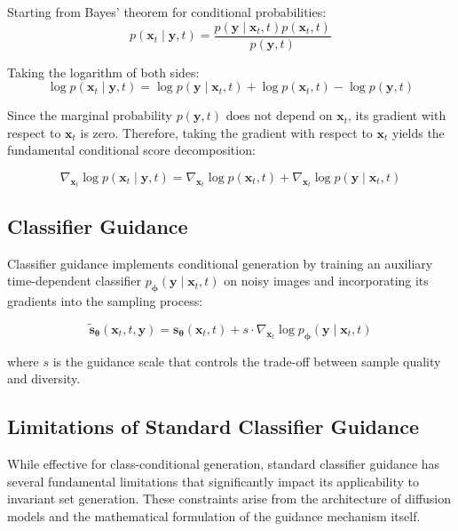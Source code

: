 Starting from Bayes' theorem for conditional probabilities:
$$p(\mathbf{x}_t \mid \mathbf{y}, t) = \frac{p(\mathbf{y} \mid \mathbf{x}_t, t) p(\mathbf{x}_t, t)}{p(\mathbf{y}, t)}$$

Taking the logarithm of both sides:
$$\log p(\mathbf{x}_t \mid \mathbf{y}, t) = \log p(\mathbf{y} \mid \mathbf{x}_t, t) + \log p(\mathbf{x}_t, t) - \log p(\mathbf{y}, t)$$

Since the marginal probability $p(\mathbf{y}, t)$ does not depend on $\mathbf{x}_t$, its gradient with respect to $\mathbf{x}_t$ is zero. Therefore, taking the gradient with respect to $\mathbf{x}_t$ yields the fundamental conditional score decomposition:

\begin{equation}
\nabla_{\mathbf{x}_t} \log p(\mathbf{x}_t \mid \mathbf{y}, t) = \nabla_{\mathbf{x}_t} \log p(\mathbf{x}_t, t) + \nabla_{\mathbf{x}_t} \log p(\mathbf{y} \mid \mathbf{x}_t, t)
\label{eq:conditional_score}
\end{equation}

\subsection{Classifier Guidance}

Classifier guidance \citep{dhariwal2021diffusionmodelsbeatgans} implements conditional generation by training an auxiliary time-dependent classifier $p_{\boldsymbol{\phi}}(\mathbf{y} \mid \mathbf{x}_t, t)$ on noisy images and incorporating its gradients into the sampling process:

\begin{equation}
\tilde{\mathbf{s}}_{\boldsymbol{\theta}}(\mathbf{x}_t, t, \mathbf{y}) = \mathbf{s}_{\boldsymbol{\theta}}(\mathbf{x}_t, t) + s \cdot \nabla_{\mathbf{x}_t} \log p_{\boldsymbol{\phi}}(\mathbf{y} \mid \mathbf{x}_t, t)
\label{eq:classifier_guidance}
\end{equation}

where $s$ is the guidance scale that controls the trade-off between sample quality and diversity.

\subsection{Limitations of Standard Classifier Guidance}

While effective for class-conditional generation, standard classifier guidance has several fundamental limitations that significantly impact its applicability to invariant set generation. These constraints arise from the architecture of diffusion models and the mathematical formulation of the guidance mechanism itself.

